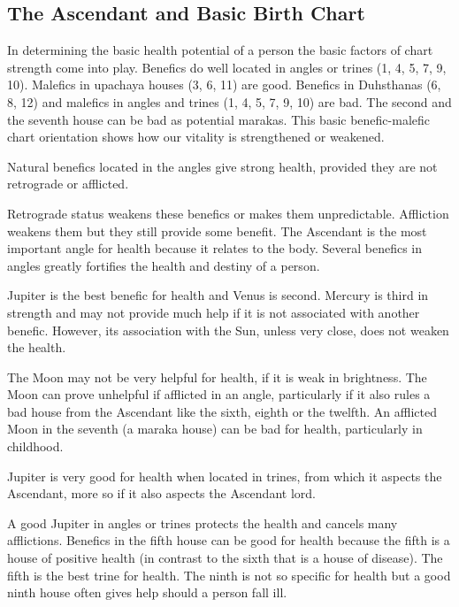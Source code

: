 \subsection{The Ascendant and Basic Birth Chart}
 

In determining the basic health potential of a person the basic factors of chart strength come into play. Benefics do well located in angles or trines (1, 4, 5, 7, 9, 10). Malefics in upachaya houses (3, 6, 11) are good. Benefics in Duhsthanas (6, 8, 12) and malefics in angles and trines (1, 4, 5, 7, 9, 10) are bad. The second and the seventh house can be bad as potential marakas. This basic benefic-malefic chart orientation shows how our vitality is strengthened or weakened.

 

Natural benefics located in the angles give strong health, provided they are not retrograde or afflicted.
 

Retrograde status weakens these benefics or makes them unpredictable. Affliction weakens them but they still provide some benefit. The Ascendant is the most important angle for health because it relates to the body. Several benefics in angles greatly fortifies the health and destiny of a person.

 

Jupiter is the best benefic for health and Venus is second. Mercury is third in strength and may not provide much help if it is not associated with another benefic. However, its association with the Sun, unless very close, does not weaken the health.

 

The Moon may not be very helpful for health, if it is weak in brightness. The Moon can prove unhelpful if afflicted in an angle, particularly if it also rules a bad house from the Ascendant like the sixth, eighth or the twelfth. An afflicted Moon in the seventh (a maraka house) can be bad for health, particularly in childhood.

 

Jupiter is very good for health when located in trines, from which it aspects the Ascendant, more so if it also aspects the Ascendant lord.
 

A good Jupiter in angles or trines protects the health and cancels many afflictions. Benefics in the fifth house can be good for health because the fifth is a house of positive health (in contrast to the sixth that is a house of disease). The fifth is the best trine for health. The ninth is not so specific for health but a good ninth house often gives help should a person fall ill.


